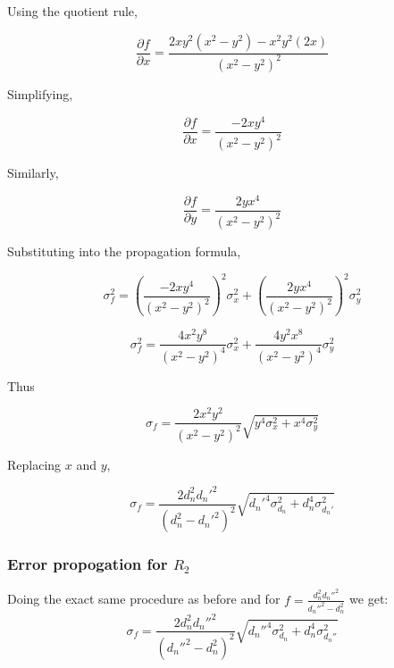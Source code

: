 \documentclass[%
sor,
jor,
 amsmath,amssymb,
 reprint,
longbibliography,
]{revtex4-2}
\begin{document}
Using the quotient rule,

\[
\frac{\partial f}{\partial x}
=
\frac{2xy^2(x^2-y^2)-x^2y^2(2x)}{(x^2-y^2)^2}
\]

Simplifying,

\[
\frac{\partial f}{\partial x}
=
\frac{-2xy^4}{(x^2-y^2)^2}
\]

Similarly,

\[
\frac{\partial f}{\partial y}
=
\frac{2yx^4}{(x^2-y^2)^2}
\]

Substituting into the propagation formula,

\[
\sigma_f^2
=
\left(\frac{-2xy^4}{(x^2-y^2)^2}\right)^2\sigma_x^2
+
\left(\frac{2yx^4}{(x^2-y^2)^2}\right)^2\sigma_y^2
\]

\[
\sigma_f^2
=
\frac{4x^2y^8}{(x^2-y^2)^4}\sigma_x^2
+
\frac{4y^2x^8}{(x^2-y^2)^4}\sigma_y^2
\]

Thus

\[
\sigma_f
=
\frac{2x^2y^2}{(x^2-y^2)^2}
\sqrt{y^4\sigma_x^2 + x^4\sigma_y^2}
\]

Replacing $x$ and $y$,

\begin{equation}
\boxed{
\sigma_f
=
\frac{2 d_n^2 d_n'^2}{(d_n^2-d_n'^2)^2}
\sqrt{
d_n'^4\sigma_{d_n}^2 +
d_n^4\sigma_{d_n'}^2
}}
\end{equation}
\subsubsection{Error propogation for $R_2$}
Doing the exact same procedure as before and for  $\displaystyle f=\frac{d_n^2 d_n''^2}{d_n''^2-d_n^2}$ we get:
\begin{equation}
\boxed{
\sigma_f
=
\frac{2 d_n^2 d_n''^2}{(d_n''^2-d_n^2)^2}
\sqrt{
d_n''^4\sigma_{d_n}^2 +
d_n^4\sigma_{d_n''}^2
}}
\end{equation}
\end{document}
